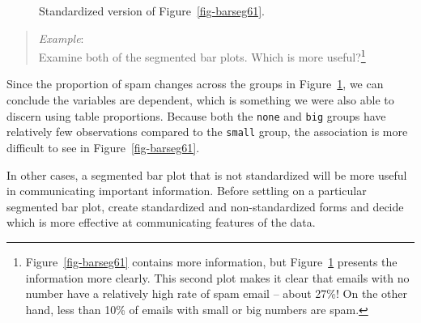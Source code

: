 \documentclass[
  letterpaper,
  DIV=11,
  numbers=noendperiod]{scrreprt}
\begin{document}
\begin{figure}[H]


\caption{\label{fig-barseg62}Standardized version of
Figure~\ref{fig-barseg61}.}

\end{figure}%

\begin{quote}
\emph{Example}:\\
Examine both of the segmented bar plots. Which is more
useful?\footnote{Figure~\ref{fig-barseg61} contains more information,
  but Figure~\ref{fig-barseg62} presents the information more clearly.
  This second plot makes it clear that emails with no number have a
  relatively high rate of spam email -- about 27\%! On the other hand,
  less than 10\% of emails with small or big numbers are spam.}
\end{quote}

Since the proportion of spam changes across the groups in
Figure~\ref{fig-barseg62}, we can conclude the variables are dependent,
which is something we were also able to discern using table proportions.
Because both the \texttt{none} and \texttt{big} groups have relatively
few observations compared to the \texttt{small} group, the association
is more difficult to see in Figure~\ref{fig-barseg61}.

In other cases, a segmented bar plot that is not standardized will be
more useful in communicating important information. Before settling on a
particular segmented bar plot, create standardized and non-standardized
forms and decide which is more effective at communicating features of
the data.
\end{document}
